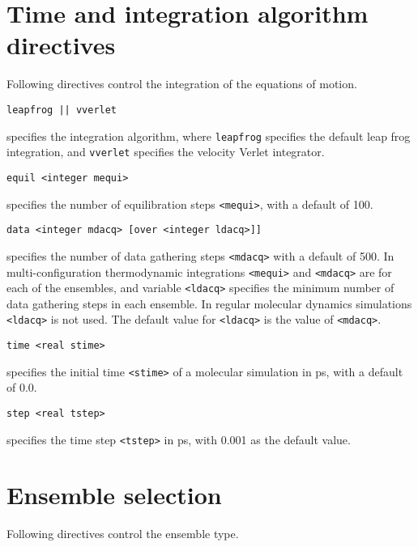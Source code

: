 \section{Time and integration algorithm directives}
Following directives control the integration of the equations of motion.
\begin{description}

\item
\begin{verbatim}
leapfrog || vverlet
\end{verbatim}
specifies the integration algorithm,
where {\tt leapfrog} specifies the default leap frog integration, and
{\tt vverlet} specifies the velocity Verlet integrator.

\item
\begin{verbatim}
equil <integer mequi>
\end{verbatim}
specifies the number of equilibration steps \verb+<mequi>+, with a default
of 100.

\item
\begin{verbatim}
data <integer mdacq> [over <integer ldacq>]]
\end{verbatim}
specifies the number of data gathering steps \verb+<mdacq>+ with a
default of 500. In multi-configuration thermodynamic integrations
\verb+<mequi>+ and \verb+<mdacq>+ are for each of the ensembles, and
variable \verb+<ldacq>+ specifies the minimum number of data gathering steps 
in each ensemble. In regular molecular dynamics simulations \verb+<ldacq>+
is not used. The default value for \verb+<ldacq>+ is the value of \verb+<mdacq>+.

\item
\begin{verbatim}
time <real stime>
\end{verbatim}
specifies the initial time \verb+<stime>+ of a molecular simulation in ps,
with a default of 0.0.

\item
\begin{verbatim}
step <real tstep>
\end{verbatim}
specifies the time step \verb+<tstep>+ in ps, with 0.001 as the default value.
\end{description}

\section{Ensemble selection}
Following directives control the ensemble type.

